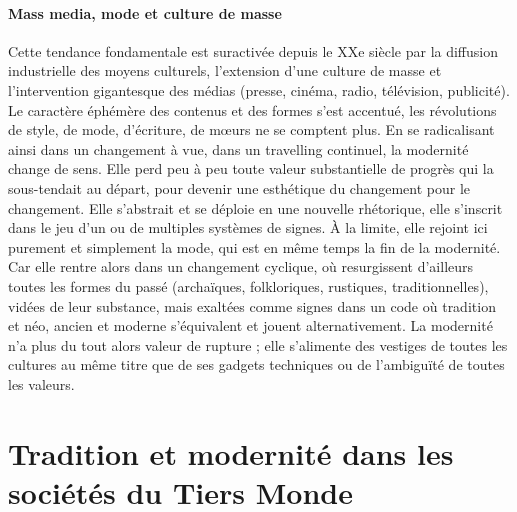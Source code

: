 \paragraph{Mass media, mode et culture de masse}
 
Cette tendance fondamentale est suractivée depuis le XXe siècle par la diffusion industrielle des moyens culturels, l'extension d'une culture de masse et l'intervention gigantesque des médias (presse, cinéma, radio, télévision, publicité). Le caractère éphémère des contenus et des formes s'est accentué, les révolutions de style, de mode, d'écriture, de mœurs ne se comptent plus. En se radicalisant ainsi dans un changement à vue, dans un travelling continuel, la modernité change de sens. Elle perd peu à peu toute valeur substantielle de progrès qui la sous-tendait au départ, pour devenir une esthétique du changement pour le changement. Elle s'abstrait et se déploie en une nouvelle rhétorique, elle s'inscrit dans le jeu d'un ou de multiples systèmes de signes. À la limite, elle rejoint ici purement et simplement la mode, qui est en même temps la fin de la modernité.
Car elle rentre alors dans un changement cyclique, où resurgissent d'ailleurs toutes les formes du passé (archaïques, folkloriques, rustiques, traditionnelles), vidées de leur substance, mais exaltées comme signes dans un code où tradition et néo, ancien et moderne s'équivalent et jouent alternativement. La modernité n'a plus du tout alors valeur de
rupture ; elle s'alimente des vestiges de toutes les cultures au même titre que de ses gadgets techniques ou de l'ambiguïté de toutes les valeurs.

\section{Tradition et modernité dans les sociétés du Tiers Monde}


